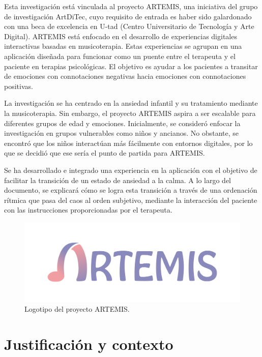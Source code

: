 Esta investigación está vinculada al proyecto ARTEMIS, una iniciativa del grupo de investigación ArtDiTec, cuyo requisito de entrada es haber sido galardonado con una beca de excelencia en U-tad (Centro Universitario de Tecnología y Arte Digital). ARTEMIS está enfocado en el desarrollo de experiencias digitales interactivas basadas en musicoterapia. Estas experiencias se agrupan en una aplicación diseñada para funcionar como un puente entre el terapeuta y el paciente en terapias psicológicas. El objetivo es ayudar a los pacientes a transitar de emociones con connotaciones negativas hacia emociones con connotaciones positivas.

La investigación se ha centrado en la ansiedad infantil y su tratamiento mediante la musicoterapia. Sin embargo, el proyecto ARTEMIS aspira a ser escalable para diferentes grupos de edad y emociones. Inicialmente, se consideró enfocar la investigación en grupos vulnerables como niños y ancianos. No obstante, se encontró que los niños interactúan más fácilmente con entornos digitales, por lo que se decidió que ese sería el punto de partida para ARTEMIS.

Se ha desarrollado e integrado una experiencia en la aplicación con el objetivo de facilitar la transición de un estado de ansiedad a la calma. A lo largo del documento, se explicará cómo se logra esta transición a través de una ordenación rítmica que pasa del caos al orden subjetivo, mediante la interacción del paciente con las instrucciones proporcionadas por el terapeuta.

\begin{figure} [h!]
	\centering
	\includegraphics[width=0.9\linewidth]{Figuras/Introduccion/1_LogoArtemis}
	\caption{Logotipo del proyecto ARTEMIS.}
	\label{fig:logoArtemis}
\end{figure}

\section{Justificación y contexto}

